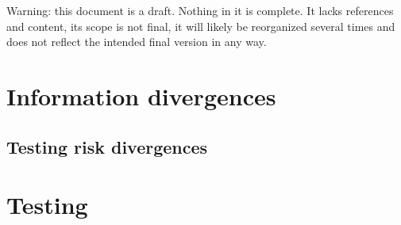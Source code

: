 %

Warning: this document is a draft. Nothing in it is complete. It lacks references and content, its scope is not final, it will likely be reorganized several times and does not reflect the intended final version in any way.




\chapter{Information divergences}



\section{Testing risk divergences}











\chapter{Testing}







\appendix




